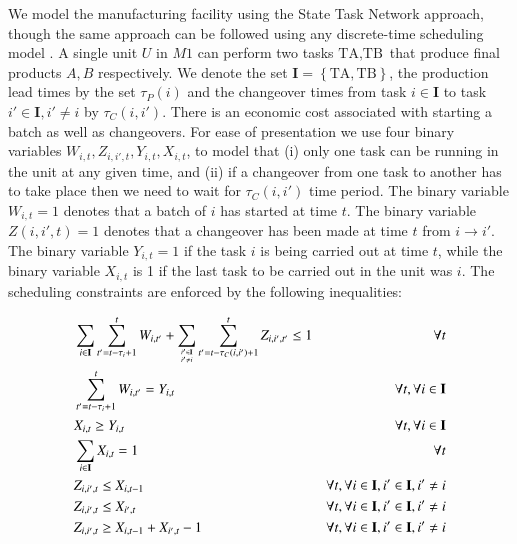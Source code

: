\documentclass{elsarticle}
\newcommand{\set}[1]{\left\lbrace #1 \right\rbrace}
\theoremstyle{definition}
\begin{document}
We model the manufacturing facility using the State Task Network
approach\cite{shah:pantelides:sargent:1993}, though the same approach can be followed using any discrete-time scheduling model \cite{mendez:cerda:grossmann:harjunkoski:fahl:2006,maravelias:2012}.  A single unit $U$ in
$M1$ can perform two tasks $\text{TA},\text{TB}$ that produce final
products $A,B$ respectively.  We denote the set $\mathbf{I} =
\set{\text{TA},\text{TB}}$, the production lead times by the set
$\tau_{P}(i)$ and the changeover times from task $i \in \mathbf{I}$ to
task $i' \in \mathbf{I}, i' \neq i$ by $\tau_{C}(i,i')$. There is an
economic cost associated with starting a batch as well as changeovers.
For ease of presentation we use four binary variables $W_{i,t}, Z_{i,i',t}, Y_{i,t}, X_{i,t}$, to model that  (i) only one task can be running in the unit at any given time, and (ii) if a changeover from one task to another has to take place then we need to wait for $\tau_{C}(i,i')$ time period. The binary variable $W_{i,t}=1$ denotes that a batch of $i$ has started at time $t$.  The binary variable $Z(i,i',t) = 1$ denotes that a changeover has  been made at time $t$ from $i \rightarrow i'$. The binary variable $Y_{i,t} = 1$ if the task $i$ is being carried out at time $t$, while the binary variable $X_{i,t}$ is 1 if the last task to be carried out in the unit was $i$.  The scheduling constraints are enforced by the following inequalities:

\begin{alignat}{2}
&\sum_{i\in \mathbf{I}}\sum_{t' = t-\tau_i+1}^{t}W_{i,t'}+\sum_{i' \in
 \mathbf{I} \atop i' \neq i}\sum_{t'=t-\tau_{C}(i,i')+1}^{t}
Z_{i,i',t'} \leq 1 & \forall t \nonumber \\ 
&\sum_{t' = t-\tau_i+1}^{t} W_{i,t'} = Y_{i,t} & \forall t, \forall i
\in \mathbf{I} \nonumber\\
&X_{i,t} \geq Y_{i,t} & \forall t, \forall i \in \mathbf{I} \nonumber\\
&\sum_{i \in \mathbf{I}}X_{i,t} = 1 & \forall
t  \label{eq:esc:assign}\\ 
&Z_{i,i',t} \leq X_{i,t-1} &\forall t, \forall i \in \mathbf{I}, i' \in
\mathbf{I}, i' \neq i \nonumber\\
&Z_{i,i',t} \leq X_{i',t} &\forall t, \forall i \in \mathbf{I}, i' \in
\mathbf{I}, i'\neq i \nonumber \\
&Z_{i,i',t} \geq X_{i,t-1}+X_{i',t}-1 &\forall t, \forall i \in \mathbf{I}, i' \in
\mathbf{I}, i' \neq i \nonumber
\end{alignat}
\end{document}
